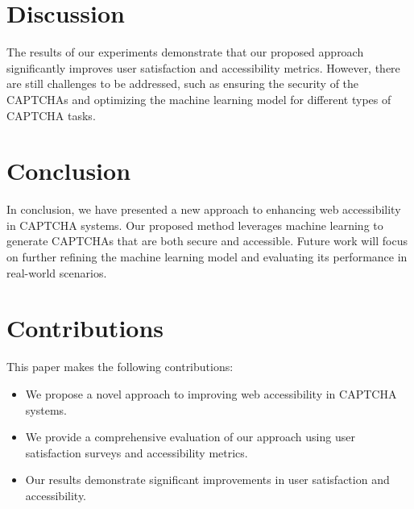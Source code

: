 \documentclass{article}
\begin{document}
\section{Discussion}\label{sec:discussion}
The results of our experiments demonstrate that our proposed approach significantly improves user satisfaction and accessibility metrics. However, there are still challenges to be addressed, such as ensuring the security of the CAPTCHAs and optimizing the machine learning model for different types of CAPTCHA tasks.

\section{Conclusion}
In conclusion, we have presented a new approach to enhancing web accessibility in CAPTCHA systems. Our proposed method leverages machine learning to generate CAPTCHAs that are both secure and accessible. Future work will focus on further refining the machine learning model and evaluating its performance in real-world scenarios.

\section{Contributions}
This paper makes the following contributions:
\begin{itemize}
    \item We propose a novel approach to improving web accessibility in CAPTCHA systems.
    \item We provide a comprehensive evaluation of our approach using user satisfaction surveys and accessibility metrics.
    \item Our results demonstrate significant improvements in user satisfaction and accessibility.
\end{itemize}



\end{document}
